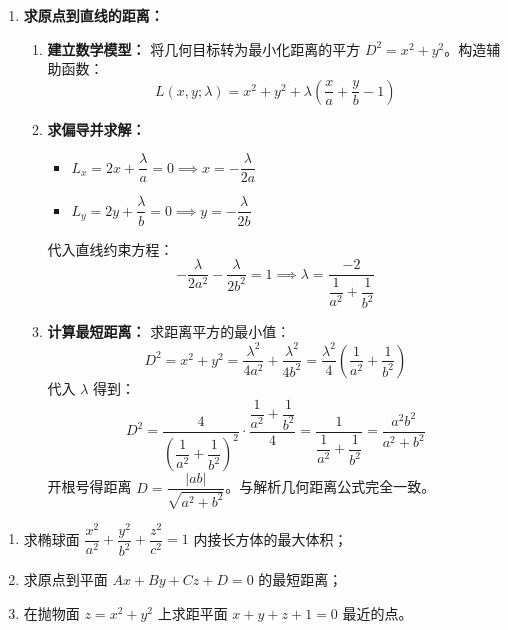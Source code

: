 \documentclass[lang=cn,11pt]{elegantbook}
\begin{document}
\begin{solution}
\begin{enumerate}
  \item[(3)] \textbf{求原点到直线的距离：}
  \begin{enumerate}
    \item \textbf{建立数学模型：}
    将几何目标转为最小化距离的平方 $D^2 = x^2+y^2$。构造辅助函数：
    \[
    L(x,y;\lambda) = x^2+y^2 + \lambda\left(\frac{x}{a}+\frac{y}{b}-1\right)
    \]
    \item \textbf{求偏导并求解：}
    \begin{itemize}
      \item $L_x = 2x + \dfrac{\lambda}{a} = 0 \implies x = -\dfrac{\lambda}{2a}$
      \item $L_y = 2y + \dfrac{\lambda}{b} = 0 \implies y = -\dfrac{\lambda}{2b}$
    \end{itemize}
    代入直线约束方程：
    \[
    -\frac{\lambda}{2a^2} - \frac{\lambda}{2b^2} = 1 \implies \lambda = \frac{-2}{\dfrac{1}{a^2}+\dfrac{1}{b^2}}
    \]
    \item \textbf{计算最短距离：}
    求距离平方的最小值：
    \[
    D^2 = x^2+y^2 = \frac{\lambda^2}{4a^2} + \frac{\lambda^2}{4b^2} = \frac{\lambda^2}{4} \left(\frac{1}{a^2}+\frac{1}{b^2}\right)
    \]
    代入 $\lambda$ 得到：
    \[
    D^2 = \frac{4}{\left(\dfrac{1}{a^2}+\dfrac{1}{b^2}\right)^2} \cdot \frac{\dfrac{1}{a^2}+\dfrac{1}{b^2}}{4} = \frac{1}{\dfrac{1}{a^2}+\dfrac{1}{b^2}} = \frac{a^2b^2}{a^2+b^2}
    \]
    开根号得距离 $D = \dfrac{|ab|}{\sqrt{a^2+b^2}}$。与解析几何距离公式完全一致。
  \end{enumerate}
\end{enumerate}
\end{solution}

\begin{exercise}[基础：三维单约束问题]
\begin{enumerate}
  \item[(1)] 求椭球面 $\dfrac{x^2}{a^2}+\dfrac{y^2}{b^2}+\dfrac{z^2}{c^2}=1$ 内接长方体的最大体积；
  \item[(2)] 求原点到平面 $Ax+By+Cz+D=0$ 的最短距离；
  \item[(3)] 在抛物面 $z=x^2+y^2$ 上求距平面 $x+y+z+1=0$ 最近的点。
\end{enumerate}
\end{exercise}
\end{document}
